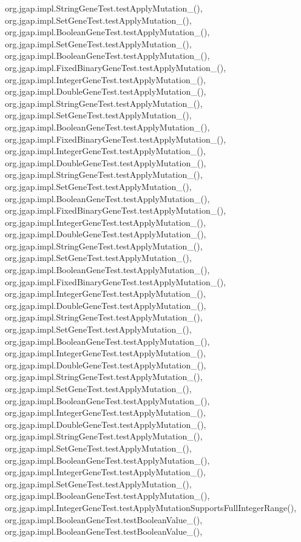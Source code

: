 org.\-jgap.\-impl.\-String\-Gene\-Test.\-test\-Apply\-Mutation\-\_(), org.\-jgap.\-impl.\-Set\-Gene\-Test.\-test\-Apply\-Mutation\-\_(), org.\-jgap.\-impl.\-Boolean\-Gene\-Test.\-test\-Apply\-Mutation\-\_(), org.\-jgap.\-impl.\-Set\-Gene\-Test.\-test\-Apply\-Mutation\-\_(), org.\-jgap.\-impl.\-Boolean\-Gene\-Test.\-test\-Apply\-Mutation\-\_(), org.\-jgap.\-impl.\-Fixed\-Binary\-Gene\-Test.\-test\-Apply\-Mutation\-\_(), org.\-jgap.\-impl.\-Integer\-Gene\-Test.\-test\-Apply\-Mutation\-\_(), org.\-jgap.\-impl.\-Double\-Gene\-Test.\-test\-Apply\-Mutation\-\_(), org.\-jgap.\-impl.\-String\-Gene\-Test.\-test\-Apply\-Mutation\-\_(), org.\-jgap.\-impl.\-Set\-Gene\-Test.\-test\-Apply\-Mutation\-\_(), org.\-jgap.\-impl.\-Boolean\-Gene\-Test.\-test\-Apply\-Mutation\-\_(), org.\-jgap.\-impl.\-Fixed\-Binary\-Gene\-Test.\-test\-Apply\-Mutation\-\_(), org.\-jgap.\-impl.\-Integer\-Gene\-Test.\-test\-Apply\-Mutation\-\_(), org.\-jgap.\-impl.\-Double\-Gene\-Test.\-test\-Apply\-Mutation\-\_(), org.\-jgap.\-impl.\-String\-Gene\-Test.\-test\-Apply\-Mutation\-\_(), org.\-jgap.\-impl.\-Set\-Gene\-Test.\-test\-Apply\-Mutation\-\_(), org.\-jgap.\-impl.\-Boolean\-Gene\-Test.\-test\-Apply\-Mutation\-\_(), org.\-jgap.\-impl.\-Fixed\-Binary\-Gene\-Test.\-test\-Apply\-Mutation\-\_(), org.\-jgap.\-impl.\-Integer\-Gene\-Test.\-test\-Apply\-Mutation\-\_(), org.\-jgap.\-impl.\-Double\-Gene\-Test.\-test\-Apply\-Mutation\-\_(), org.\-jgap.\-impl.\-String\-Gene\-Test.\-test\-Apply\-Mutation\-\_(), org.\-jgap.\-impl.\-Set\-Gene\-Test.\-test\-Apply\-Mutation\-\_(), org.\-jgap.\-impl.\-Boolean\-Gene\-Test.\-test\-Apply\-Mutation\-\_(), org.\-jgap.\-impl.\-Fixed\-Binary\-Gene\-Test.\-test\-Apply\-Mutation\-\_(), org.\-jgap.\-impl.\-Integer\-Gene\-Test.\-test\-Apply\-Mutation\-\_(), org.\-jgap.\-impl.\-Double\-Gene\-Test.\-test\-Apply\-Mutation\-\_(), org.\-jgap.\-impl.\-String\-Gene\-Test.\-test\-Apply\-Mutation\-\_(), org.\-jgap.\-impl.\-Set\-Gene\-Test.\-test\-Apply\-Mutation\-\_(), org.\-jgap.\-impl.\-Boolean\-Gene\-Test.\-test\-Apply\-Mutation\-\_(), org.\-jgap.\-impl.\-Integer\-Gene\-Test.\-test\-Apply\-Mutation\-\_(), org.\-jgap.\-impl.\-Double\-Gene\-Test.\-test\-Apply\-Mutation\-\_(), org.\-jgap.\-impl.\-String\-Gene\-Test.\-test\-Apply\-Mutation\-\_(), org.\-jgap.\-impl.\-Set\-Gene\-Test.\-test\-Apply\-Mutation\-\_(), org.\-jgap.\-impl.\-Boolean\-Gene\-Test.\-test\-Apply\-Mutation\-\_(), org.\-jgap.\-impl.\-Integer\-Gene\-Test.\-test\-Apply\-Mutation\-\_(), org.\-jgap.\-impl.\-Double\-Gene\-Test.\-test\-Apply\-Mutation\-\_(), org.\-jgap.\-impl.\-String\-Gene\-Test.\-test\-Apply\-Mutation\-\_(), org.\-jgap.\-impl.\-Set\-Gene\-Test.\-test\-Apply\-Mutation\-\_(), org.\-jgap.\-impl.\-Boolean\-Gene\-Test.\-test\-Apply\-Mutation\-\_(), org.\-jgap.\-impl.\-Integer\-Gene\-Test.\-test\-Apply\-Mutation\-\_(), org.\-jgap.\-impl.\-Set\-Gene\-Test.\-test\-Apply\-Mutation\-\_(), org.\-jgap.\-impl.\-Boolean\-Gene\-Test.\-test\-Apply\-Mutation\-\_(), org.\-jgap.\-impl.\-Integer\-Gene\-Test.\-test\-Apply\-Mutation\-Supports\-Full\-Integer\-Range(), org.\-jgap.\-impl.\-Boolean\-Gene\-Test.\-test\-Boolean\-Value\-\_(), org.\-jgap.\-impl.\-Boolean\-Gene\-Test.\-test\-Boolean\-Value\-\_(), 